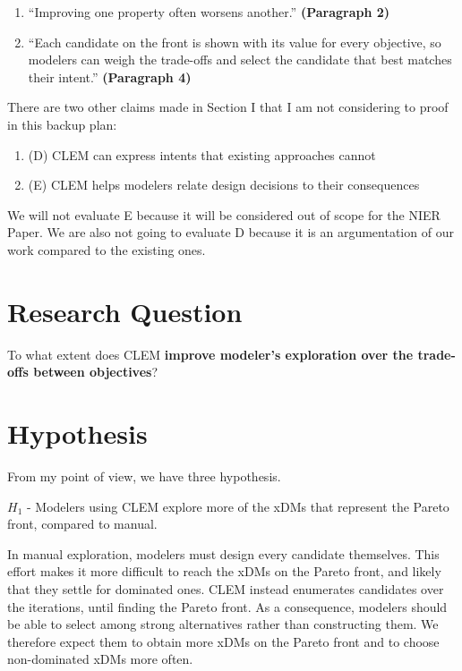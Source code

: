 \documentclass[11pt,a4paper]{article}
\begin{document}
\begin{enumerate}
    \item ``Improving one property often worsens another.'' \textbf{(Paragraph 2)}
    \item ``Each candidate on the front is shown with its value for every objective, so modelers can weigh the trade-offs and select the candidate that best matches their intent.'' \textbf{(Paragraph 4)}
\end{enumerate}

There are two other claims made in Section I that I am not considering to proof in this backup plan:

\begin{enumerate}
    \item (D) CLEM can express intents that existing approaches cannot
    \item (E) CLEM helps modelers relate design decisions to their consequences
\end{enumerate}

We will not evaluate E because it will be considered out of scope for the NIER Paper. We are also not going to evaluate D because it is an argumentation of our work compared to the existing ones.

\section{Research Question}

To what extent does CLEM \textbf{improve modeler's exploration over the trade-offs between objectives}?


\section{Hypothesis}

From my point of view, we have three hypothesis. 

\begin{framedtext}
$H_1$ - Modelers using CLEM explore more of the xDMs that represent the Pareto front, compared to manual. 
\end{framedtext}

In manual exploration, modelers must design every candidate themselves. This effort makes it more difficult to reach the xDMs on the Pareto front, and likely that they settle for dominated ones. CLEM instead enumerates candidates over the iterations, until finding the Pareto front. As a consequence, modelers should be able to select among strong alternatives rather than constructing them. We therefore expect them to obtain more xDMs on the Pareto front and to choose non-dominated xDMs more often. 
\end{document}
